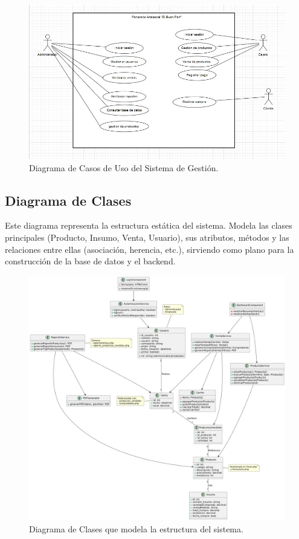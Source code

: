 \documentclass[conference]{IEEEtran}
\begin{document}
\begin{figure}[htbp]
\centerline{\includegraphics[width=0.9\columnwidth]{images/diagrama_casos_uso.jpg}}
\caption{Diagrama de Casos de Uso del Sistema de Gestión.}
\label{fig:casos_uso}
\end{figure}

\subsection{Diagrama de Clases}
Este diagrama representa la estructura estática del sistema. Modela las clases principales (Producto, Insumo, Venta, Usuario), sus atributos, métodos y las relaciones entre ellas (asociación, herencia, etc.), sirviendo como plano para la construcción de la base de datos y el backend.

\begin{figure}[htbp]
\centerline{\includegraphics[width=\columnwidth]{images/diagrama_clases.jpg}}
\caption{Diagrama de Clases que modela la estructura del sistema.}
\label{fig:clases}
\end{figure}
\end{document}
